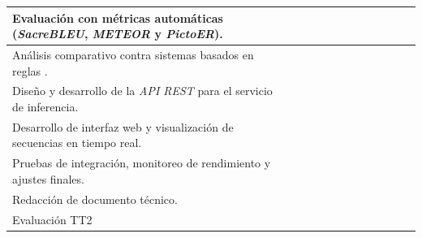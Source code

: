 \documentclass[10pt,letterpaper]{article}
\begin{document}
\begin{table}[H]
\begin{tabular}{|p{5.5cm}|c|c|c|c|c|c|c|c|c|c|c|}
Evaluación con métricas automáticas (\textit{SacreBLEU}, \textit{METEOR} y \textit{PictoER}). & & & & & & & \cellcolor{gris30} & \cellcolor{gris30} & & & \\ \hline

Análisis comparativo contra sistemas basados en reglas . & & & & & & & & \cellcolor{gris30} & \cellcolor{gris30} & & \\ \hline

Diseño y desarrollo de la \textit{API REST} para el servicio de inferencia. & & & & & & & & & \cellcolor{gris30} & \cellcolor{gris30} & \\ \hline

Desarrollo de interfaz web y visualización de secuencias en tiempo real. & & & & & & & & & & \cellcolor{gris30} & \cellcolor{gris30} \\ \hline

Pruebas de integración, monitoreo de rendimiento y ajustes finales. & & & & & & & & & & & \cellcolor{gris30} \\ \hline

Redacción de documento técnico. & & & \cellcolor{gris30} & \cellcolor{gris30} & \cellcolor{gris30} & \cellcolor{gris30} & \cellcolor{gris30} & \cellcolor{gris30} & \cellcolor{gris30} & \cellcolor{gris30} & \\ \hline

Evaluación TT2 & & & & & & & & & & \cellcolor{gris30} & \cellcolor{gris30} \\ \hline
\end{tabular}
\end{table}
\end{document}

